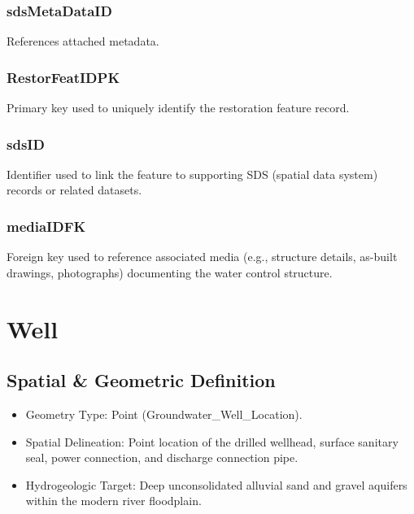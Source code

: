 \documentclass[
  letterpaper,
  DIV=11,
  numbers=noendperiod]{scrreprt}
\begin{document}
\subsection{sdsMetaDataID}\label{sdsmetadataid-14}

References attached metadata.

\subsection{RestorFeatIDPK}\label{restorfeatidpk-14}

Primary key used to uniquely identify the restoration feature record.

\subsection{sdsID}\label{sdsid-14}

Identifier used to link the feature to supporting SDS (spatial data
system) records or related datasets.

\subsection{mediaIDFK}\label{mediaidfk-14}

Foreign key used to reference associated media (e.g., structure details,
as-built drawings, photographs) documenting the water control structure.

\chapter{Well}\label{well}

\section{Spatial \& Geometric
Definition}\label{spatial-geometric-definition-15}

\begin{itemize}
\item
  Geometry Type: Point (Groundwater\_Well\_Location).
\item
  Spatial Delineation: Point location of the drilled wellhead, surface
  sanitary seal, power connection, and discharge connection pipe.
\item
  Hydrogeologic Target: Deep unconsolidated alluvial sand and gravel
  aquifers within the modern river floodplain.
\end{itemize}
\end{document}
